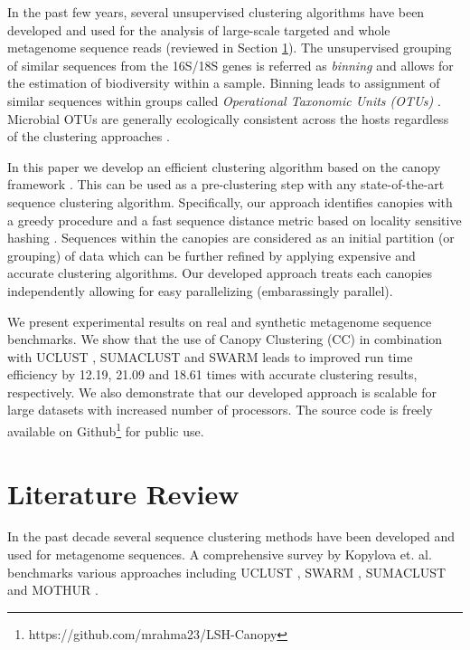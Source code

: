 \documentclass[10pt, conference, compsocconf]{IEEEtran}
\begin{document}
In the past few years, several unsupervised 
clustering algorithms have been developed and
used for the analysis of large-scale targeted and whole 
metagenome sequence reads 
(reviewed in Section \ref{sec:Literature}). The 
unsupervised grouping  of similar sequences from the 
16S/18S genes is referred as \emph{binning} and 
allows for the estimation of biodiversity within a sample. Binning 
leads to assignment of similar sequences within groups called \emph{Operational Taxonomic Units (OTUs)} \cite{MAROTU}. Microbial OTUs are generally 
ecologically consistent across the hosts regardless of the 
clustering approaches \cite{MAROTUConsistant}. 


In this paper we develop an 
efficient clustering algorithm based on  the canopy framework \cite{MARCanopy}. This  can be used as a pre-clustering  
step with any state-of-the-art sequence clustering algorithm. Specifically, 
our approach identifies canopies with a greedy procedure and a 
fast sequence distance metric based on locality 
sensitive hashing \cite{MARLshRef2}. Sequences within the canopies are 
considered as an initial partition (or grouping) of data which can be 
further refined by applying expensive and accurate clustering 
algorithms. Our developed approach treats each canopies independently 
allowing for easy parallelizing (embarassingly parallel). 

We present experimental results on 
real and synthetic metagenome sequence
benchmarks. We show that the 
use of Canopy Clustering (CC) in combination 
with UCLUST \cite{MARuclust}, SUMACLUST \cite{MARSumaclust} and 
SWARM \cite{MARSwarm2} leads to improved run 
time efficiency by 12.19, 21.09 and 18.61 times with accurate clustering results, respectively. We also demonstrate that our 
developed approach is scalable for large datasets with 
increased number of processors. The 
source code is freely available on Github\footnote{https://github.com/mrahma23/LSH-Canopy} for public use. 

          

\section{Literature Review}
\label{sec:Literature}

In the past decade several 
sequence clustering methods have been developed and
used  for metagenome sequences. A comprehensive survey 
by Kopylova et. al. \cite{MARopenDeNovo} benchmarks 
various  approaches 
including UCLUST \cite{MARuclust}, SWARM \cite{MARSwarm2}, 
SUMACLUST \cite{MARSumaclust} and MOTHUR \cite{MARMothur}. 
\end{document}
